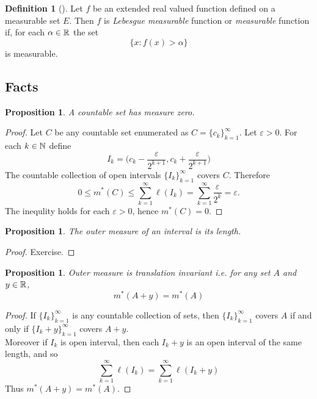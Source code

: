 \documentclass[	DIV=calc,paper=a4,fontsize=11pt]{scrartcl}	 	%
\newtheorem{prop}[thm]{Proposition}
\theoremstyle{definition}
\newtheorem{defn}[thm]{Definition}
\theoremstyle{plain}
\theoremstyle{remark}
\begin{document}
\begin{defn}[\textbf{\color{blue}{Measurable function}}]
Let $f$ be an extended real valued function defined on a measurable set $E$. Then $f$ is \textit{Lebesgue measurable} function or \textit{measurable} function if, for each $\alpha\in\Bbb R$ the set
\[\{x:f(x)>\alpha\}\]
is measurable.
\end{defn}

\subsection{Facts}
\begin{prop}
A countable set has measure zero.
\end{prop}

\begin{proof}
Let $C$ be any countable set enumerated as $C=\{c_k\}_{k=1}^{\infty}$. Let $\varepsilon>0$. For each $k\in \Bbb N$ define
\[I_k=\biggl(c_k-\frac{\varepsilon}{2^{k+1}},c_k+\frac{\varepsilon}{2^{k+1}}\biggl)\]
The countable collection of open intervals $\{I_k\}_{k=1}^{\infty}$ covers $C$. Therefore
\[0\leq m^*(C)\leq \sum_{k=1}^{\infty}\ell(I_k)=\sum_{k=1}^{\infty}\frac{\varepsilon}{2^{k}}=\varepsilon.\]
The inequlity holds for each $\varepsilon>0$, hence $m^*(C)=0$.
\end{proof}
\begin{prop}
The outer measure of an interval is its length.
\end{prop}
\begin{proof}
Exercise.
\end{proof}
\begin{prop}
Outer measure is translation invariant i.e. for any set $A$ and $y\in \Bbb R$,
\[m^*(A+y)=m^*(A)\]
\end{prop}
\begin{proof}
If $\{I_k\}_{k=1}^{\infty}$ is any countable collection of sets, then $\{I_k\}_{k=1}^{\infty}$ covers $A$ if and only if $\{I_k+y\}_{k=1}^{\infty}$ covers $A+y$. \\
Moreover if $I_k$ is open interval, then each $I_k+y$ is an open interval of the same length, and so
\[\sum_{k=1}^{\infty}\ell(I_k)=\sum_{k=1}^{\infty}\ell(I_k+y)\]
Thus $m^*(A+y)=m^*(A)$.
\end{proof}
\end{document}
